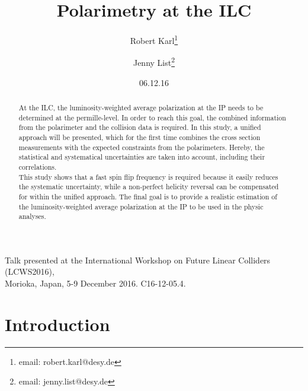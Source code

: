 \documentclass[a4paper]{article}
\title{Polarimetry at the ILC}
\author[,1,2,3]{Robert Karl\thanks{email: robert.karl@desy.de}}
\author[,1]{Jenny List\thanks{email: jenny.list@desy.de}}
\affil[1]{Deutsches Elektronen-Synchrotron (DESY)}
\affil[2]{University of Hamburg, Germany}
\date{06.12.16}
\begin{document}
\maketitle %
\thispagestyle{empty} %

\begin{abstract}
At the ILC, the luminosity-weighted average polarization at the IP needs to be determined at the permille-level. In order to reach this goal, the combined information from the polarimeter and the collision data is required. In this study, a unified approach will be presented, which for the first time combines the cross section measurements with the expected constraints from the polarimeters. Hereby, the statistical and systematical uncertainties are taken into account, including their correlations.\\
This study shows that a fast spin flip frequency is required because it easily reduces the systematic uncertainty, while a non-perfect helicity reversal can be compensated for within the unified approach. The final goal is to provide a realistic estimation of the luminosity-weighted average polarization at the IP to be used in the physic analyses.
\end{abstract}
\vfill
\begin{center}
\large{\footnotemark[3] Talk presented at the International Workshop on Future Linear Colliders\\[0.5em] (LCWS2016),\\[0.5em] Morioka, Japan, 5-9 December 2016. C16-12-05.4.}
\end{center}
\vfill

\newpage

\section{Introduction}
\end{document}
